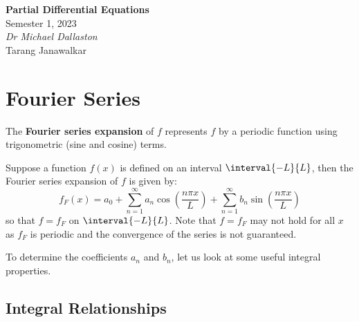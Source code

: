 \documentclass{article}
\date{}
\newcommand{\unitName}{Partial Differential Equations}
\newcommand{\unitTime}{Semester 1, 2023}
\newcommand{\unitCoordinator}{Dr Michael Dallaston}
\newcommand{\documentAuthors}{Tarang Janawalkar}
\begin{document}
%
\begin{titlepage}
    \vspace*{\fill}
    \begin{center}
        \LARGE{\textbf{\unitName}} \\[0.1in]
        \normalsize{\unitTime} \\[0.2in]
        \normalsize\textit{\unitCoordinator} \\[0.2in]
        \documentAuthors
    \end{center}
    \vspace*{\fill}
    \doclicenseThis
    \thispagestyle{empty}
\end{titlepage}
\newpage
%
\tableofcontents
\newpage
%
\section{Fourier Series}
\begin{definition}
    The \textbf{Fourier series expansion} of \(f\) represents \(f\) by a periodic function using trigonometric (sine and cosine) terms.

    Suppose a function \(f\left( x \right)\) is defined on an interval
    \(\interval{-L}{L}\), then the Fourier series expansion of \(f\) is
    given by:
    \begin{equation}
        \label{eq:fourier}
        f_F\left( x \right) = a_0 + \sum_{n = 1}^\infty a_n \cos{\left( \frac{n \pi x}{L} \right)} + \sum_{n = 1}^\infty b_n \sin{\left( \frac{n \pi x}{L} \right)}
    \end{equation}
    so that \(f = f_F\) on \(\interval{-L}{L}\). Note that \(f = f_F\) may not hold for all \(x\) as \(f_F\) is periodic and the convergence of the series is not guaranteed.
\end{definition}
To determine the coefficients \(a_n\) and \(b_n\), let us look at some useful integral properties.
\subsection{Integral Relationships}
\end{document}
